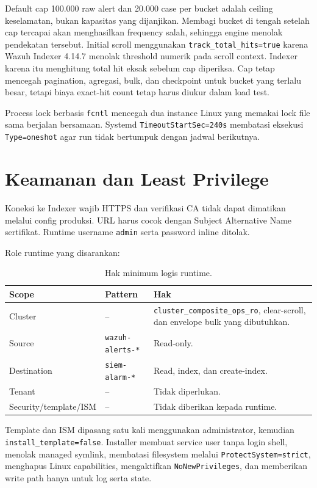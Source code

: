 \documentclass[11pt,a4paper,oneside]{report}
\DeclareRobustCommand{\code}[1]{\nolinkurl{#1}}
\begin{document}
Default cap 100.000 raw alert dan 20.000 case per bucket adalah ceiling keselamatan,
bukan kapasitas yang dijanjikan. Membagi bucket di tengah setelah cap tercapai akan
menghasilkan frequency salah, sehingga engine menolak pendekatan tersebut.
Initial scroll menggunakan \code{track\_total\_hits=true} karena Wazuh Indexer
4.14.7 menolak threshold numerik pada scroll context. Indexer karena itu menghitung
total hit eksak sebelum cap diperiksa. Cap tetap mencegah pagination, agregasi,
bulk, dan checkpoint untuk bucket yang terlalu besar, tetapi biaya exact-hit count
tetap harus diukur dalam load test.

Process lock berbasis \code{fcntl} mencegah dua instance Linux yang memakai lock file
sama berjalan bersamaan. Systemd \code{TimeoutStartSec=240s} membatasi eksekusi
\code{Type=oneshot} agar run tidak bertumpuk dengan jadwal berikutnya.

\chapter{Keamanan dan Least Privilege}

Koneksi ke Indexer wajib HTTPS dan verifikasi CA tidak dapat dimatikan melalui
config produksi. URL harus cocok dengan Subject Alternative Name sertifikat.
Runtime username \code{admin} serta password inline ditolak.

Role runtime yang disarankan:

\begin{table}[ht]
\centering
\caption{Hak minimum logis runtime.}
\begin{tabularx}{\textwidth}{l l X}
\toprule
\textbf{Scope} & \textbf{Pattern} & \textbf{Hak}\\
\midrule
Cluster & -- & \code{cluster\_composite\_ops\_ro}, clear-scroll, dan envelope bulk yang dibutuhkan.\\
Source & \code{wazuh-alerts-*} & Read-only.\\
Destination & \code{siem-alarm-*} & Read, index, dan create-index.\\
Tenant & -- & Tidak diperlukan.\\
Security/template/ISM & -- & Tidak diberikan kepada runtime.\\
\bottomrule
\end{tabularx}
\end{table}

Template dan ISM dipasang satu kali menggunakan administrator, kemudian
\code{install\_template=false}. Installer membuat service user tanpa login shell,
menolak managed symlink, membatasi filesystem melalui \code{ProtectSystem=strict},
menghapus Linux capabilities, mengaktifkan \code{NoNewPrivileges}, dan memberikan
write path hanya untuk log serta state.
\end{document}
